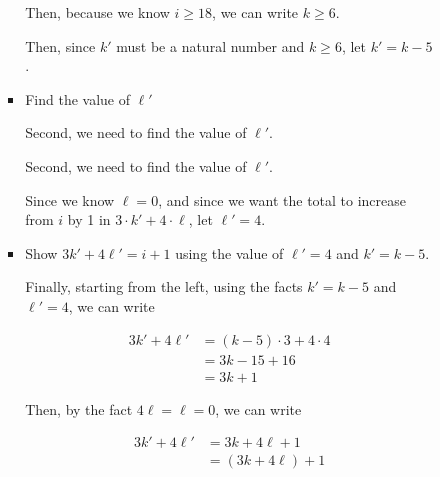 \documentclass[12pt]{article}
\begin{document}
\begin{itemize}
\begin{mdframed}
\begin{enumerate}[1.]
\begin{enumerate}[1.]
\begin{itemize}
\begin{mdframed}
                    \bigskip

                    Then, because we know $i \geq 18$, we can write $k \geq 6$.

                    \bigskip

                    Then, since $k'$ must be a natural number and $k \geq 6$, let $k' = k - 5$.

                    \end{mdframed}

                    \item Find the value of $\ell'$

                    \bigskip

                    Second, we need to find the value of $\ell'$.

                    \begin{mdframed}
                    Second, we need to find the value of $\ell'$.

                    \bigskip

                    Since we know $\ell = 0$, and since we want the total to increase from $i$ by 1
                    in $3 \cdot k' + 4 \cdot \ell$, let $\ell' = 4$.
                    \end{mdframed}

                    \item Show $3k' + 4\ell' = i + 1$ using the value of $\ell' = 4$ and $k' = k - 5$.

                    \begin{mdframed}
                    Finally, starting from the left, using the facts $k' = k - 5$ and $\ell' = 4$, we can write

                    \begin{align}
                    3k' + 4\ell' &= (k-5) \cdot 3 + 4 \cdot 4\\
                    &= 3k - 15 + 16\\
                    &= 3k + 1
                    \end{align}

                    \bigskip

                    Then, by the fact $4\ell = \ell = 0$, we can write

                    \begin{align}
                    3k' + 4\ell' &= 3k + 4\ell + 1\\
                    &= (3k + 4\ell) + 1
                    \end{align}


\end{mdframed}
\end{itemize}
\end{enumerate}
\end{enumerate}
\end{mdframed}
\end{itemize}
\end{document}
